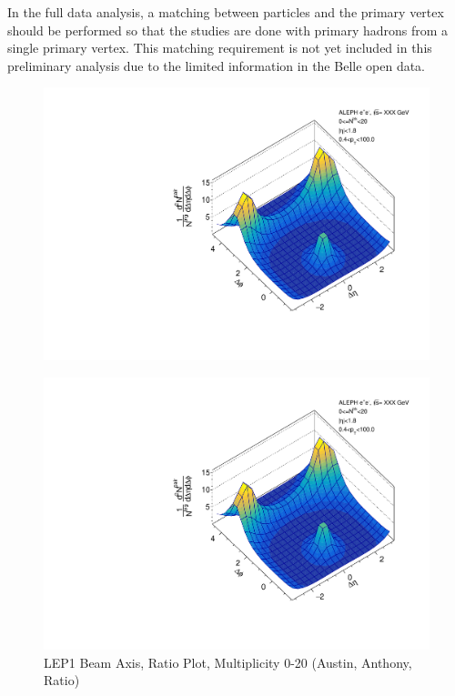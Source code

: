 In the full data analysis, a matching between particles and the primary vertex should be performed so that the studies are done with primary hadrons from a single primary vertex. This matching requirement is not yet included in this preliminary analysis due to the limited information in the Belle open data. 



\begin{figure}[htbp]
  \caption{LEP1 Beam Axis, Ratio Plot, Multiplicity 0-20 (Austin, Anthony, Ratio)}
  \begin{minipage}[b]{0.32\linewidth}
    \centering
    \includegraphics[width=\linewidth]{images/TwoParticleCorrelation/LEP1_BEAM/LEP1_BEAM_ratio1_0_20.pdf}
    \label{fig:LEP1 Beam Axis, Ratio Plot, Multiplicity 0-20, Austin}
  \end{minipage}
  \hspace{0.0cm}
  \begin{minipage}[b]{0.32\linewidth}
    \centering
    \includegraphics[width=\linewidth]{images/TwoParticleCorrelation/LEP1_BEAM/LEP1_BEAM_ratio2_0_20.pdf}

\end{minipage}
\end{figure}
